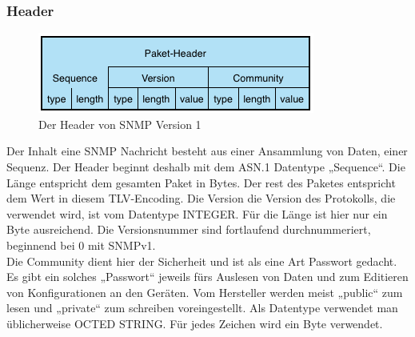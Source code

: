 \documentclass[11pt,a4paper]{article}
\begin{document}
\subsubsection{Header}
\begin{figure}[h]
	\centering
	\includegraphics[scale=1]{Bilder/SNMPv1-Header}
	\caption{Der Header von SNMP Version 1}
\end{figure}
Der Inhalt eine SNMP Nachricht besteht aus einer Ansammlung von Daten, einer Sequenz. Der Header beginnt deshalb mit dem ASN.1 Datentype „Sequence“. Die Länge entspricht dem gesamten Paket in Bytes. Der rest des Paketes entspricht dem Wert in diesem TLV-Encoding.
Die Version die Version des Protokolls, die verwendet wird, ist vom Datentype INTEGER. Für die Länge ist hier nur ein Byte ausreichend. Die Versionsnummer sind fortlaufend durchnummeriert, beginnend bei 0 mit SNMPv1.\\
Die Community dient hier der Sicherheit und ist als eine Art Passwort gedacht. Es gibt ein solches „Passwort“ jeweils fürs Auslesen von Daten und zum Editieren von Konfigurationen an den Geräten. Vom Hersteller werden meist „public“ zum lesen und „private“ zum schreiben voreingestellt. Als Datentype verwendet man üblicherweise OCTED STRING. Für jedes Zeichen wird ein Byte verwendet.\\
\end{document}
